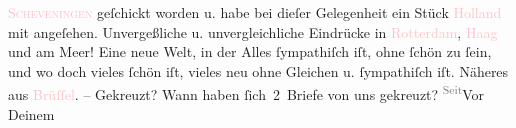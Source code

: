                   \textsc{\textcolor{pink}{Scheveningen}{}\ledrightnote{\textcolor{pink}{Scheveningen}}} geſchickt worden u. habe bei dieſer Gelegenheit ein Stück \textcolor{pink}{Holland}{}\ledrightnote{\textcolor{pink}{Niederlande}} mit angeſehen. Unvergeßliche u. unvergleichliche
               Eindrücke in \textcolor{pink}{Rotterdam}{}\ledrightnote{\textcolor{pink}{Rotterdam}}, \textcolor{pink}{Haag}{}\ledrightnote{\textcolor{pink}{Den Haag}} und am Meer! Eine neue Welt, in der Alles ſympathiſch
               iſt,  ohne ſchön zu ſein, und wo doch vieles
               ſchön iſt, vieles neu ohne Gleichen u. ſympathiſch iſt. Näheres aus \textcolor{pink}{Brüſſel}{}\ledrightnote{\textcolor{pink}{Brüssel}}. – Gekreuzt? Wann haben ſich 2 Briefe von uns gekreuzt? \substVorne{}\textsuperscript{\textcolor{gray}{Seit}}\substDazwischen{}Vor\substHinten{} Deinem \label{T_L02666-1v}\label{T_L02666-1h}{ }\label{T_L02666-2v}\label{T_L02666-2h}\pend
           \endnumbering{}  
      